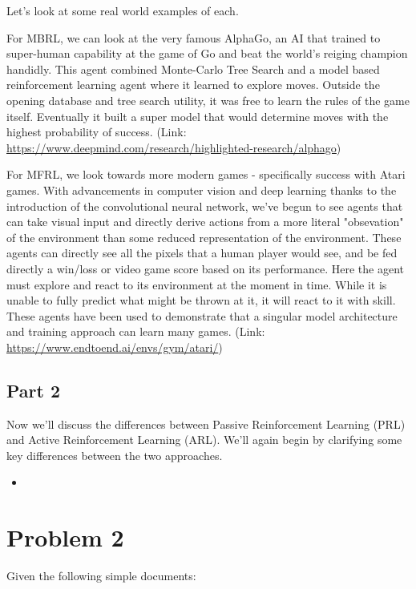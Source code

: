 \documentclass{article}
\begin{document}
\noindent Let's look at some real world examples of each.

For MBRL, we can look at the very famous AlphaGo, an AI that trained to super-human capability at the game of Go and beat the world's reiging champion handidly. This agent combined Monte-Carlo Tree Search and a model based reinforcement learning agent where it learned to explore moves. Outside the opening database and tree search utility, it was free to learn the rules of the game itself. Eventually it built a super model that would determine moves with the highest probability of success. (Link: \url{https://www.deepmind.com/research/highlighted-research/alphago})

For MFRL, we look towards more modern games - specifically success with Atari games. With advancements in computer vision and deep learning thanks to the introduction of the convolutional neural network, we've begun to see agents that can take visual input and directly derive actions from a more literal "obsevation" of the environment than some reduced representation of the environment. These agents can directly see all the pixels that a human player would see, and be fed directly a win/loss or video game score based on its performance. Here the agent must explore and react to its environment at the moment in time. While it is unable to fully predict what might be thrown at it, it will react to it with skill. These agents have been used to demonstrate that a singular model architecture and training approach can learn many games. (Link: \url{https://www.endtoend.ai/envs/gym/atari/})

\subsection*{Part 2}

Now we'll discuss the differences between Passive Reinforcement Learning (PRL) and Active Reinforcement Learning (ARL). We'll again begin by clarifying some key differences between the two approaches.

\begin{itemize}
    \item 
\end{itemize}


\section*{Problem 2}

Given the following simple documents:
\end{document}
